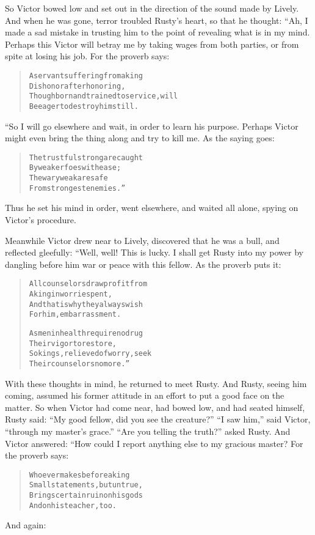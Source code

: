 \documentclass[article, twoside, 14pt]{memoir}
\renewenvironment{verbatim}{%
\begin{quote}%
\vskip -10pt%
\begin{alltt}\normalfont\large}{\end{alltt}%
\end{quote}%
\vskip -10pt
} %
\begin{document}
So Victor bowed low and set out in the direction of the sound made
by Lively. And when he was gone, terror troubled Rusty's heart, so
that he thought: “Ah, I made a sad mistake in trusting him to the
point of revealing what is in my mind. Perhaps this Victor will
betray me by taking wages from both parties, or from spite at
losing his job. For the proverb says:

\begin{verbatim}
A servant suffering from a king
Dishonor after honoring,
Though born and trained to service, will
Be eager to destroy him still.
\end{verbatim}
“So I will go elsewhere and wait, in order to learn his purpose.
Perhaps Victor might even bring the thing along and try to kill me.
As the saying goes:

\begin{verbatim}
The trustful strong are caught
    By weaker foes with ease;
The wary weak are safe
    From strongest enemies.”
\end{verbatim}
Thus he set his mind in order, went elsewhere, and waited all
alone, spying on Victor's procedure.

Meanwhile Victor drew near to Lively, discovered that he was a
bull, and reflected gleefully: “Well, well! This is lucky. I shall
get Rusty into my power by dangling before him war or peace with
this fellow. As the proverb puts it:

\begin{verbatim}
All counselors draw profit from
    A king in worries pent,
And that is why they always wish
    For him, embarrassment.

As men in health require no drug
    Their vigor to restore,
So kings, relieved of worry, seek
    Their counselors no more.”
\end{verbatim}
With these thoughts in mind, he returned to meet Rusty. And Rusty,
seeing him coming, assumed his former attitude in an effort to put
a good face on the matter. So when Victor had come near, had bowed
low, and had seated himself, Rusty said:
``My good fellow, did you see the creature?'' ``I saw him,'' said
Victor, ``through my master's grace.''
``Are you telling the truth?'' asked Rusty. And Victor answered:
“How could I report anything else to my gracious master? For the
proverb says:

\begin{verbatim}
Whoever makes before a king
    Small statements, but untrue,
Brings certain ruin on his gods
    And on his teacher, too.
\end{verbatim}
And again:
\end{document}
